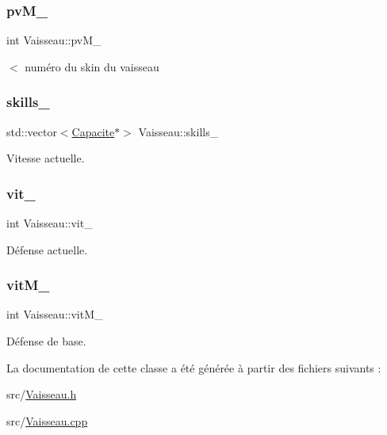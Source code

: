 \subsubsection{\texorpdfstring{pv\+M\+\_\+}{pvM\_}}
{\footnotesize\ttfamily int Vaisseau\+::pv\+M\+\_\+\hspace{0.3cm}{\ttfamily [protected]}}



$<$ numéro du skin du vaisseau 

\mbox{\label{class_vaisseau_a7fccd409e1f27f968bbe3f8ee1ded206}} 
\subsubsection{\texorpdfstring{skills\+\_\+}{skills\_}}
{\footnotesize\ttfamily std\+::vector$<$\hyperlink{class_capacite}{Capacite}$\ast$$>$ Vaisseau\+::skills\+\_\+\hspace{0.3cm}{\ttfamily [protected]}}



Vitesse actuelle. 

\mbox{\label{class_vaisseau_afab28349b10bc1d8c48888f84c4386dd}} 
\subsubsection{\texorpdfstring{vit\+\_\+}{vit\_}}
{\footnotesize\ttfamily int Vaisseau\+::vit\+\_\+\hspace{0.3cm}{\ttfamily [protected]}}



Défense actuelle. 

\mbox{\label{class_vaisseau_a7cf3915f4d4044ee28fd5e5633fce11c}} 
\subsubsection{\texorpdfstring{vit\+M\+\_\+}{vitM\_}}
{\footnotesize\ttfamily int Vaisseau\+::vit\+M\+\_\+\hspace{0.3cm}{\ttfamily [protected]}}



Défense de base. 



La documentation de cette classe a été générée à partir des fichiers suivants \+:\begin{DoxyCompactItemize}
\item 
src/\hyperlink{_vaisseau_8h}{Vaisseau.\+h}\item 
src/\hyperlink{_vaisseau_8cpp}{Vaisseau.\+cpp}\end{DoxyCompactItemize}
